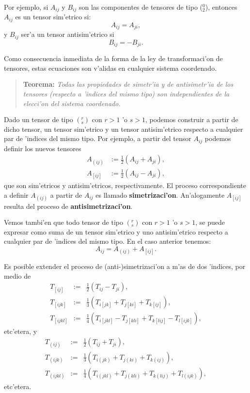Por ejemplo, si $A_{ij}$ y $B_{ij}$ son las componentes de tensores de tipo
($_2^0$), entonces $A_{ij}$ es un tensor sim'etrico si:
\begin{equation}
A_{ij}=A_{ji}, \label{sim1}
\end{equation}
y $B_{ij}$ ser'a un tensor antisim'etrico si
\begin{equation}
B_{ij}=-B_{ji}. \label{sim2}
\end{equation}

Como consecuencia inmediata de la forma de la ley de transformaci'on de
tensores, estas ecuaciones son v'alidas en cualquier sistema coordenado.

\begin{quotation}
\textbf{Teorema:} \textit{Todas las propiedades de simetr'ia y de
antisimetr'ia de los tensores (respecto a 'indices del mismo tipo) son independientes de la elecci'on del sistema coordenado.}
\end{quotation}

Dado un tensor de tipo $(^r_s)$ con $r>1$ 'o $s>1$, podemos construir
a partir de dicho tensor, un tensor sim'etrico y un tensor
antisim'etrico respecto a cualquier par de 'indices del mismo tipo. Por ejemplo, a partir del tensor $A_{ij}$ podemos definir los nuevos tensores
\begin{align}
A_{(ij)} & :=\frac{1}2\left( A_{ij}+A_{ji}\right) ,\label{sim3}\\
A_{[ij]} & :=\frac{1}2\left( A_{ij}-A_{ji}\right) ,\nonumber
\end{align}
que son sim'etricos y antisim'etricos, respectivamente. El proceso
correspondiente a definir $A_{(ij)}$ a partir de $A_{ij}$ es llamado \textbf{simetrizaci'on}. An'alogamente $A_{[ij]}$ resulta del proceso de \textbf{antisimetrizaci'on}.

Vemos tambi'en que todo tensor de tipo $(^r_s)$ con $r>1$ 'o $s>1$, se
puede expresar como suma de un tensor sim'etrico y uno antisim'etrico respecto a
cualquier par de 'indices del mismo tipo. En el caso anterior
tenemos:
\begin{equation}
A_{ij}=A_{(ij)}+A_{[ij]}.\label{sim4}
\end{equation}

Es posible extender el proceso de (anti-)simetrizaci'on a m'as de dos 'indices, por
medio de
\begin{eqnarray}
T_{[ij]}&:=&\frac{1}2(T_{ij}-T_{ji}), \\
T_{[ijk]}&:=&\frac{1}{3}(T_{i[jk]}+T_{j[ki]}+T_{k[ij]}), \label{as3}\\
T_{[ijkl]}&:=&\frac{1}{4}(T_{i[jkl]}-T_{j[kli]}+T_{k[lij]}-T_{l[ijk]}),
\end{eqnarray}
etc'etera, y
\begin{eqnarray}
T_{(ij)}&:=&\frac{1}2(T_{ij}+T_{ji}), \\
T_{(ijk)}&:=&\frac{1}{3}(T_{i(jk)}+T_{j(ki)}+T_{k(ij)}), \\
T_{(ijkl)}&:=&\frac{1}{4}(T_{i(jkl)}+T_{j(kli)}+T_{k(lij)}+T_{l(ijk)}),
\end{eqnarray}
etc'etera.

